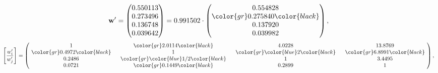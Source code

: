 \begin{example}
\begin{equation*}
\mathbf{w}^{\prime} =
\begin{pmatrix}
0.550113\\
0.273496\\
0.136748\\
0.039642
\end{pmatrix} =
0.991502\cdot
\begin{pmatrix}
0.554828\\
\color{gr} 0.275840\color{black} \\
0.137920\\
0.039982
\end{pmatrix},
\end{equation*}
\begin{equation*}
\left[ \frac{{w}^{\prime}_i}{{w}^{\prime}_j} \right] =
\begin{pmatrix}
$\,\,$ 1 $\,\,$ & $\,\,$\color{gr} 2.0114\color{black} $\,\,$ & $\,\,$4.0228$\,\,$ & $\,\,$13.8769$\,\,$ \\
$\,\,$\color{gr} 0.4972\color{black} $\,\,$ & $\,\,$ 1 $\,\,$ & $\,\,$\color{gr} \color{blue} 2\color{black} $\,\,$ & $\,\,$\color{gr} 6.8991\color{black}   $\,\,$ \\
$\,\,$0.2486$\,\,$ & $\,\,$\color{gr} \color{blue}  1/2\color{black} $\,\,$ & $\,\,$ 1 $\,\,$ & $\,\,$3.4495 $\,\,$ \\
$\,\,$0.0721$\,\,$ & $\,\,$\color{gr} 0.1449\color{black} $\,\,$ & $\,\,$0.2899$\,\,$ & $\,\,$ 1  $\,\,$ \\
\end{pmatrix},
\end{equation*}
\end{example}
\newpage

